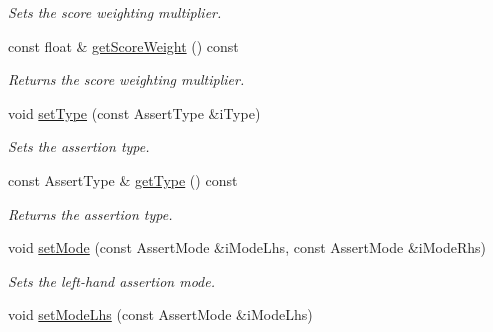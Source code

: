 \begin{DoxyCompactItemize}
\begin{DoxyCompactList}\small\item\em Sets the score weighting multiplier. \end{DoxyCompactList}\item 
\hypertarget{class_assertion_ab56b536f685ec371b16dc563283b6bb6}{const float \& \hyperlink{class_assertion_ab56b536f685ec371b16dc563283b6bb6}{get\-Score\-Weight} () const }\label{class_assertion_ab56b536f685ec371b16dc563283b6bb6}

\begin{DoxyCompactList}\small\item\em Returns the score weighting multiplier. \end{DoxyCompactList}\item 
\hypertarget{class_assertion_ad13971eb3844f686fdd7b48459a0949f}{void \hyperlink{class_assertion_ad13971eb3844f686fdd7b48459a0949f}{set\-Type} (const Assert\-Type \&i\-Type)}\label{class_assertion_ad13971eb3844f686fdd7b48459a0949f}

\begin{DoxyCompactList}\small\item\em Sets the assertion type. \end{DoxyCompactList}\item 
\hypertarget{class_assertion_a7f1f97192d8b0c323de25c70bec720bd}{const Assert\-Type \& \hyperlink{class_assertion_a7f1f97192d8b0c323de25c70bec720bd}{get\-Type} () const }\label{class_assertion_a7f1f97192d8b0c323de25c70bec720bd}

\begin{DoxyCompactList}\small\item\em Returns the assertion type. \end{DoxyCompactList}\item 
\hypertarget{class_assertion_a460c09864d8b88fc263cecef3de8b617}{void \hyperlink{class_assertion_a460c09864d8b88fc263cecef3de8b617}{set\-Mode} (const Assert\-Mode \&i\-Mode\-Lhs, const Assert\-Mode \&i\-Mode\-Rhs)}\label{class_assertion_a460c09864d8b88fc263cecef3de8b617}

\begin{DoxyCompactList}\small\item\em Sets the left-\/hand assertion mode. \end{DoxyCompactList}\item 
\hypertarget{class_assertion_a95d508dcbdea589c8a0241eacf1bf91c}{void \hyperlink{class_assertion_a95d508dcbdea589c8a0241eacf1bf91c}{set\-Mode\-Lhs} (const Assert\-Mode \&i\-Mode\-Lhs)}\label{class_assertion_a95d508dcbdea589c8a0241eacf1bf91c}


\end{DoxyCompactItemize}
